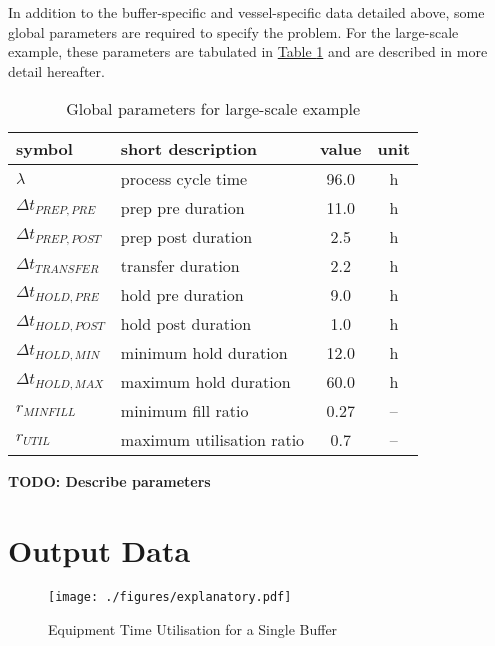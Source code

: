 In addition to the buffer-specific and vessel-specific data detailed above,
some global parameters are required to specify the problem.
For the large-scale example, these parameters are tabulated in
\hyperref[tbl.parameters]{Table \ref*{tbl.parameters}} and are described in
more detail hereafter.
\begin{table}[h!]
    \centering
    \caption{Global parameters for large-scale example}
    \label{tbl.parameters}
    \begin{tabular}{l | l | c | c}
        symbol & short description & value & unit\\ \hline
        $\lambda$ & process cycle time & 96.0 & h\\
        $\Delta t_{PREP,PRE}$ & prep pre duration & 11.0 & h\\
        $\Delta t_{PREP,POST}$ & prep post duration & 2.5 & h\\
        $\Delta t_{TRANSFER}$ & transfer duration & 2.2 & h\\
        $\Delta t_{HOLD,PRE}$ & hold pre duration & 9.0 & h\\
        $\Delta t_{HOLD,POST}$ & hold post duration & 1.0 & h\\
        $\Delta t_{HOLD,MIN}$ & minimum hold duration & 12.0 & h\\
        $\Delta t_{HOLD,MAX}$ & maximum hold duration & 60.0 & h\\
        $r_{MINFILL}$ & minimum fill ratio & 0.27 & --\\
        $r_{UTIL}$ & maximum utilisation ratio & 0.7 & --\\
    \end{tabular}
\end{table}

\textbf{TODO: Describe parameters}

\section{Output Data}\label{S.outputdata}

\begin{figure}
    \centering
    \texttt{[image: ./figures/explanatory.pdf]}
    \caption{Equipment Time Utilisation for a Single Buffer}
    \label{fig.explanatory}
\end{figure}
